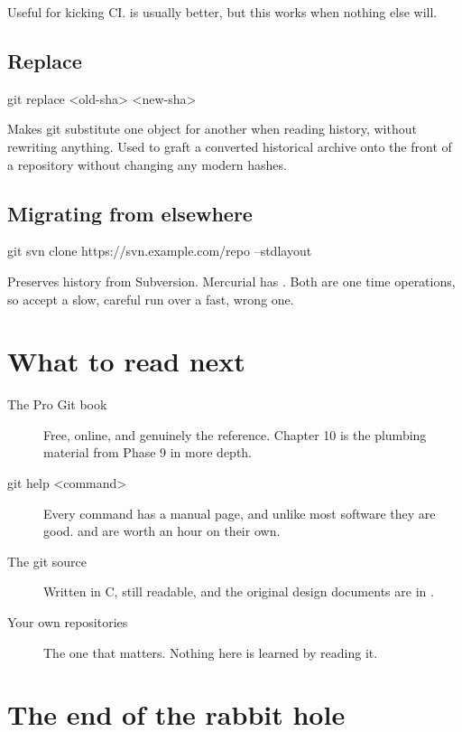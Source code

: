 \documentclass[11pt]{article}
\begin{document}
Useful for kicking CI.  is usually better, but this works when
nothing else will.

\subsection{Replace}

\begin{shell}
git replace <old-sha> <new-sha>
\end{shell}

Makes git substitute one object for another when reading history, without rewriting
anything. Used to graft a converted historical archive onto the front of a repository
without changing any modern hashes.

\subsection{Migrating from elsewhere}

\begin{shell}
git svn clone https://svn.example.com/repo --stdlayout
\end{shell}

Preserves history from Subversion. Mercurial has . Both are one
time operations, so accept a slow, careful run over a fast, wrong one.

\section{What to read next}

\begin{description}
  \item[The Pro Git book] Free, online, and genuinely the reference. Chapter 10 is the
    plumbing material from Phase 9 in more depth.
  \item[git help <command>] Every command has a manual page, and unlike most software
    they are good.  and  are worth an
    hour on their own.
  \item[The git source] Written in C, still readable, and the original design
    documents are in .
  \item[Your own repositories] The one that matters. Nothing here is learned by
    reading it.
\end{description}

\section{The end of the rabbit hole}
\end{document}
